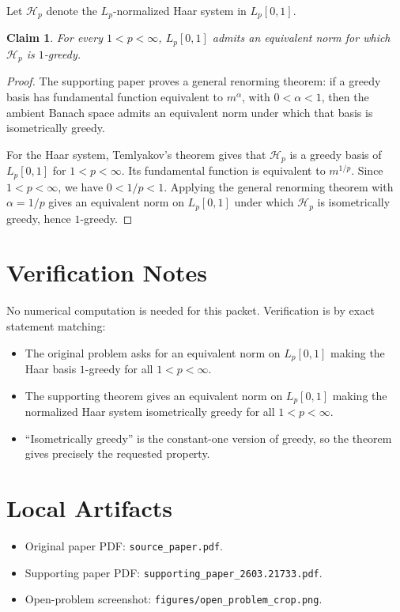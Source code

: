 \documentclass[11pt]{article}
\newtheorem*{claim}{Claim}
\begin{document}
Let \(\mathcal H_p\) denote the \(L_p\)-normalized Haar system in
\(L_p[0,1]\).

\begin{claim}
For every \(1<p<\infty\), \(L_p[0,1]\) admits an equivalent norm for
which \(\mathcal H_p\) is \(1\)-greedy.
\end{claim}

\begin{proof}
The supporting paper proves a general renorming theorem: if a greedy
basis has fundamental function equivalent to \(m^\alpha\), with
\(0<\alpha<1\), then the ambient Banach space admits an equivalent norm
under which that basis is isometrically greedy.

For the Haar system, Temlyakov's theorem gives that \(\mathcal H_p\) is
a greedy basis of \(L_p[0,1]\) for \(1<p<\infty\). Its fundamental
function is equivalent to \(m^{1/p}\). Since \(1<p<\infty\), we have
\(0<1/p<1\). Applying the general renorming theorem with
\(\alpha=1/p\) gives an equivalent norm on \(L_p[0,1]\) under which
\(\mathcal H_p\) is isometrically greedy, hence \(1\)-greedy.
\end{proof}

\section*{Verification Notes}

No numerical computation is needed for this packet. Verification is by
exact statement matching:

\begin{itemize}
\item The original problem asks for an equivalent norm on \(L_p[0,1]\)
making the Haar basis \(1\)-greedy for all \(1<p<\infty\).
\item The supporting theorem gives an equivalent norm on \(L_p[0,1]\)
making the normalized Haar system isometrically greedy for all
\(1<p<\infty\).
\item ``Isometrically greedy'' is the constant-one version of greedy,
so the theorem gives precisely the requested property.
\end{itemize}

\section*{Local Artifacts}

\begin{itemize}
\item Original paper PDF: \texttt{source\_paper.pdf}.
\item Supporting paper PDF: \texttt{supporting\_paper\_2603.21733.pdf}.
\item Open-problem screenshot: \texttt{figures/open\_problem\_crop.png}.
\end{itemize}
\end{document}
